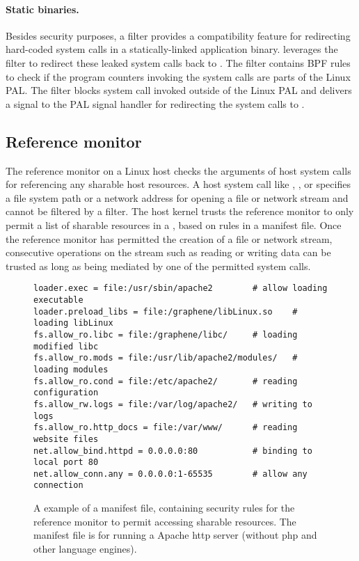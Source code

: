 \paragraph{Static binaries.}
Besides security purposes,
a \seccomp{} filter provides a compatibility feature
for redirecting hard-coded system calls
in a statically-linked application binary.
\graphene{} leverages the \seccomp{} filter to redirect these leaked system calls
back to \thelibos{}. 
The filter contains BPF rules to check if the program counters
invoking the system calls
are parts of the Linux PAL.
The filter blocks system call invoked outside of the Linux PAL
and delivers a  signal
to the PAL signal handler for redirecting the system calls to \thelibos{}.



\subsection{Reference monitor}
\label{sec:linux:security:ref-monitor}

The reference monitor on a Linux host
checks the arguments of host system calls for referencing any sharable host resources.
A host system call like , , or 
specifies a file system path or a network address
for opening a file or network stream and cannot be filtered by a \seccomp{} filter.
The host kernel trusts the reference monitor
to only permit
a list of sharable resources in a \picoproc{},
based on
rules in a manifest file.
Once the reference monitor has permitted the creation of a file or network stream,
consecutive operations on the stream
such as reading or writing data can be trusted
as long as being mediated by one of the permitted system calls.


\begin{figure}
\centering
\begin{lstlisting}
loader.exec = file:/usr/sbin/apache2        # allow loading executable 
loader.preload_libs = file:/graphene/libLinux.so    # loading libLinux
fs.allow_ro.libc = file:/graphene/libc/     # loading modified libc
fs.allow_ro.mods = file:/usr/lib/apache2/modules/   # loading modules
fs.allow_ro.cond = file:/etc/apache2/       # reading configuration
fs.allow_rw.logs = file:/var/log/apache2/   # writing to logs
fs.allow_ro.http_docs = file:/var/www/      # reading website files
net.allow_bind.httpd = 0.0.0.0:80           # binding to local port 80
net.allow_conn.any = 0.0.0.0:1-65535        # allow any connection
\end{lstlisting}
\caption{A example of a manifest file, containing security rules for the reference monitor to permit accessing sharable resources. The manifest file is for running a Apache http server (without php and other language engines).}
\label{fig:linux:manifest-example}
\end{figure}


